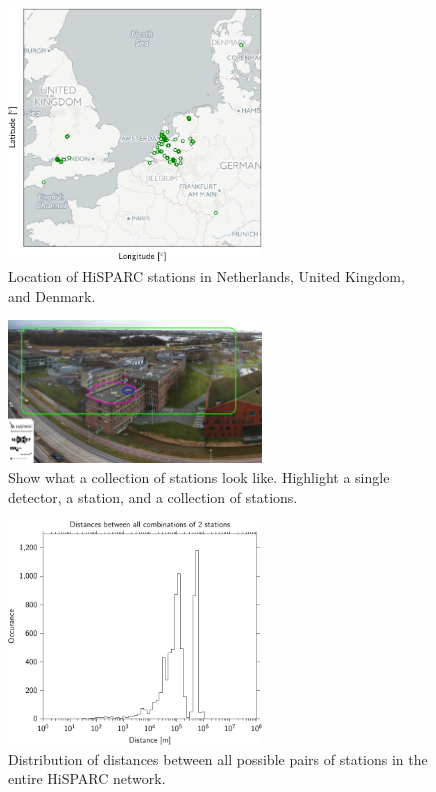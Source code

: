 \begin{figure}
    \centering
    \includegraphics[width=0.6\textwidth]
                    {plots/experiment/network}
    \caption{Location of HiSPARC stations in Netherlands, United Kingdom, and Denmark.}
    \label{fig:network}
\end{figure}


\begin{figure}
    \centering
    \includegraphics[width=0.6\textwidth]
                    {plots/experiment/ADL_151373_151429_layers.jpg}
    \caption{Show what a collection of stations look like. Highlight a single detector, a station, and a collection of stations.}
    \label{fig:ADL_151373_151429_layers}
\end{figure}


\begin{figure}
    \centering
    \includegraphics[width=0.6\textwidth]
                    {plots/experiment/network_station_distances}
    \caption{Distribution of distances between all possible pairs of stations in the entire HiSPARC network.}
    \label{fig:network_station_distances}
\end{figure}


